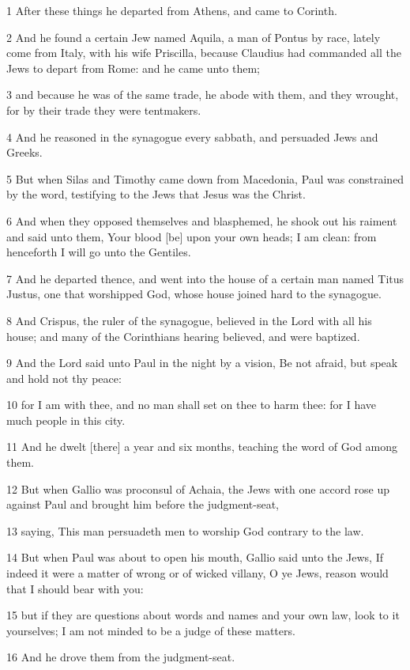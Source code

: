 \par 1 After these things he departed from Athens, and came to Corinth.
\par 2 And he found a certain Jew named Aquila, a man of Pontus by race, lately come from Italy, with his wife Priscilla, because Claudius had commanded all the Jews to depart from Rome: and he came unto them;
\par 3 and because he was of the same trade, he abode with them, and they wrought, for by their trade they were tentmakers.
\par 4 And he reasoned in the synagogue every sabbath, and persuaded Jews and Greeks.
\par 5 But when Silas and Timothy came down from Macedonia, Paul was constrained by the word, testifying to the Jews that Jesus was the Christ.
\par 6 And when they opposed themselves and blasphemed, he shook out his raiment and said unto them, Your blood [be] upon your own heads; I am clean: from henceforth I will go unto the Gentiles.
\par 7 And he departed thence, and went into the house of a certain man named Titus Justus, one that worshipped God, whose house joined hard to the synagogue.
\par 8 And Crispus, the ruler of the synagogue, believed in the Lord with all his house; and many of the Corinthians hearing believed, and were baptized.
\par 9 And the Lord said unto Paul in the night by a vision, Be not afraid, but speak and hold not thy peace:
\par 10 for I am with thee, and no man shall set on thee to harm thee: for I have much people in this city.
\par 11 And he dwelt [there] a year and six months, teaching the word of God among them.
\par 12 But when Gallio was proconsul of Achaia, the Jews with one accord rose up against Paul and brought him before the judgment-seat,
\par 13 saying, This man persuadeth men to worship God contrary to the law.
\par 14 But when Paul was about to open his mouth, Gallio said unto the Jews, If indeed it were a matter of wrong or of wicked villany, O ye Jews, reason would that I should bear with you:
\par 15 but if they are questions about words and names and your own law, look to it yourselves; I am not minded to be a judge of these matters.
\par 16 And he drove them from the judgment-seat.
